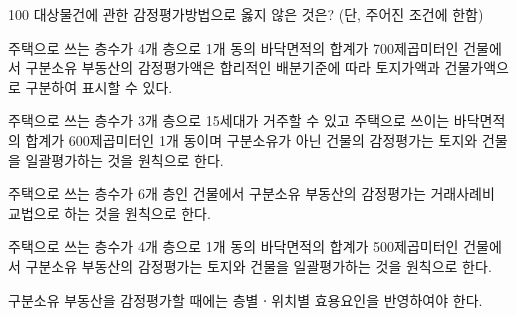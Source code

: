 \begin{question}{100}
대상물건에 관한 감정평가방법으로 옳지 않은 것은? (단, 주어진 조건에 한함)
\begin{choices}
  \item 주택으로 쓰는 층수가 4개 층으로 1개 동의 바닥면적의 합계가 700제곱미터인 건물에서 구분소유 부동산의 감정평가액은 합리적인 배분기준에 따라 토지가액과 건물가액으로 구분하여 표시할 수 있다.
  \item 주택으로 쓰는 층수가 3개 층으로 15세대가 거주할 수 있고 주택으로 쓰이는 바닥면적의 합계가 600제곱미터인 1개 동이며 구분소유가 아닌 건물의 감정평가는 토지와 건물을 일괄평가하는 것을 원칙으로 한다.
  \item 주택으로 쓰는 층수가 6개 층인 건물에서 구분소유 부동산의 감정평가는 거래사례비 교법으로 하는 것을 원칙으로 한다.
  \item 주택으로 쓰는 층수가 4개 층으로 1개 동의 바닥면적의 합계가 500제곱미터인 건물에서 구분소유 부동산의 감정평가는 토지와 건물을 일괄평가하는 것을 원칙으로 한다.
  \item 구분소유 부동산을 감정평가할 때에는 층별ㆍ위치별 효용요인을 반영하여야 한다.
\end{choices}
\end{question}
